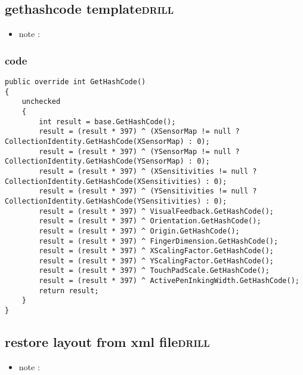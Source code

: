\documentclass[11pt]{article}
\begin{document}
\subsection{gethashcode template\hfill{}\textsc{drill}}
\label{sec:orgf50be20}
\begin{itemize}
\item note :
\end{itemize}
\subsubsection{code}
\label{sec:org113c4bc}
\begin{verbatim}
public override int GetHashCode()
{
    unchecked
    {
        int result = base.GetHashCode();
        result = (result * 397) ^ (XSensorMap != null ? CollectionIdentity.GetHashCode(XSensorMap) : 0);
        result = (result * 397) ^ (YSensorMap != null ? CollectionIdentity.GetHashCode(YSensorMap) : 0);
        result = (result * 397) ^ (XSensitivities != null ? CollectionIdentity.GetHashCode(XSensitivities) : 0);
        result = (result * 397) ^ (YSensitivities != null ? CollectionIdentity.GetHashCode(YSensitivities) : 0);
        result = (result * 397) ^ VisualFeedback.GetHashCode();
        result = (result * 397) ^ Orientation.GetHashCode();
        result = (result * 397) ^ Origin.GetHashCode();
        result = (result * 397) ^ FingerDimension.GetHashCode();
        result = (result * 397) ^ XScalingFactor.GetHashCode();
        result = (result * 397) ^ YScalingFactor.GetHashCode();
        result = (result * 397) ^ TouchPadScale.GetHashCode();
        result = (result * 397) ^ ActivePenInkingWidth.GetHashCode();
        return result;
    }
}

\end{verbatim}

\subsection{restore layout from xml file\hfill{}\textsc{drill}}
\label{sec:org4886a5d}
\begin{itemize}
\item note :
\end{itemize}
\end{document}
